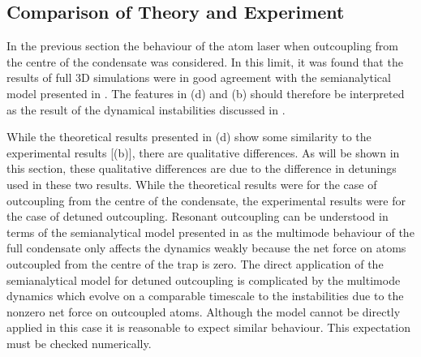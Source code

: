 \subsection{Comparison of Theory and Experiment}

In the previous section the behaviour of the atom laser when outcoupling from the centre of the condensate was considered.  In this limit, it was found that the results of full 3D simulations were in good agreement with the semianalytical model presented in .  The features in (d) and (b) should therefore be interpreted as the result of the dynamical instabilities discussed in . 

While the theoretical results presented in (d) show some similarity to the experimental results [(b)], there are qualitative differences.  As will be shown in this section, these qualitative differences are due to the difference in detunings used in these two results.  While the theoretical results were for the case of outcoupling from the centre of the condensate, the experimental results were for the case of detuned outcoupling.  Resonant outcoupling can be understood in terms of the semianalytical model presented in  as the multimode behaviour of the full condensate only affects the dynamics weakly because the net force on atoms outcoupled from the centre of the trap is zero.  The direct application of the semianalytical model for detuned outcoupling is complicated by the multimode dynamics which evolve on a comparable timescale to the instabilities due to the nonzero net force on outcoupled atoms.  Although the model cannot be directly applied in this case it is reasonable to expect similar behaviour.  This expectation must be checked numerically.

